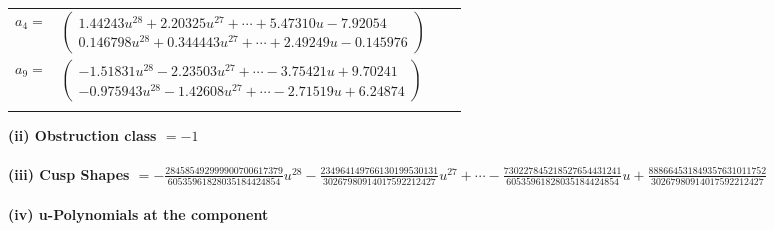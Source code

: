 \documentclass[1p]{elsarticle_modified}
\theoremstyle{definition}
\begin{document}
\begin{tabular}{m{7pt} m{180pt} m{7pt} m{180pt} }
\flushright $a_{4}=$&$\begin{pmatrix}1.44243 u^{28}+2.20325 u^{27}+\cdots+5.47310 u-7.92054\\0.146798 u^{28}+0.344443 u^{27}+\cdots+2.49249 u-0.145976\end{pmatrix}$ \\
\flushright $a_{9}=$&$\begin{pmatrix}-1.51831 u^{28}-2.23503 u^{27}+\cdots-3.75421 u+9.70241\\-0.975943 u^{28}-1.42608 u^{27}+\cdots-2.71519 u+6.24874\end{pmatrix}$\\&\end{tabular}
\flushleft \textbf{(ii) Obstruction class $= -1$}\\~\\
\flushleft \textbf{(iii) Cusp Shapes $= -\frac{284585492999900700617379}{60535961828035184424854} u^{28}-\frac{234964149766130199530131}{30267980914017592212427} u^{27}+\cdots-\frac{730227845218527654431241}{60535961828035184424854} u+\frac{888664531849357631011752}{30267980914017592212427}$}\\~\\
\newpage\renewcommand{\arraystretch}{1}
\flushleft \textbf{(iv) u-Polynomials at the component}\newline \\
\end{document}
